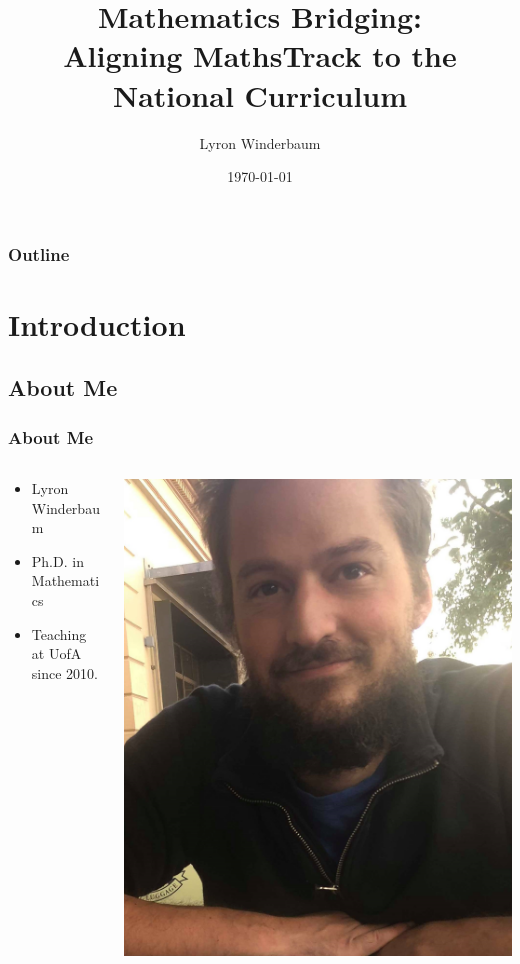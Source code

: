 \documentclass[14pt]{beamer}
\title{Mathematics Bridging: \\ Aligning MathsTrack to the National Curriculum}
\author{Lyron Winderbaum}
\institute{University of Adelaide}
\date{\today}
\begin{document}
\begin{frame}
\titlepage
\end{frame}

\begin{frame}
\frametitle{Outline}
\tableofcontents
\end{frame}

\section{Introduction}

\subsection{About Me}
\begin{frame}
\frametitle{About Me}
\begin{minipage}[0.4\textheight]{\textwidth}
\begin{columns}[T]
\begin{column}{0.6\textwidth}
\begin{itemize}
	\item Lyron Winderbaum
	\item Ph.D. in Mathematics
	\item Teaching at UofA since 2010.
\end{itemize}
\end{column}
\begin{column}{0.4\textwidth}
	\includegraphics[scale=0.1]{../../photos/portrait.jpg}
\end{column}
\end{columns}
\end{minipage}
\end{frame}
\end{document}
